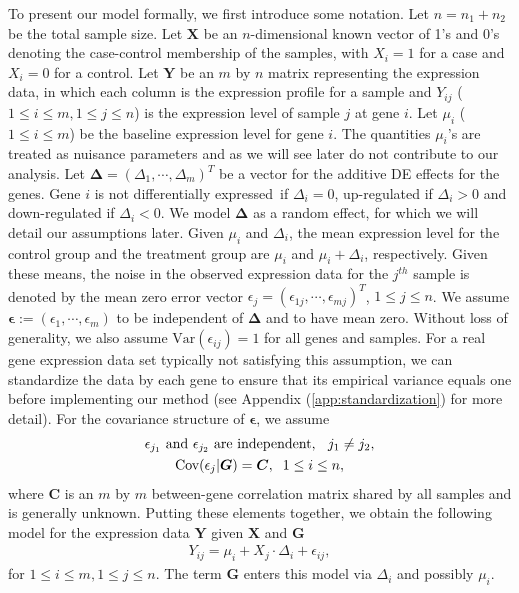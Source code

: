 \documentclass[a4,center,fleqn]{NAR}
\newcommand{\DED}{differentially expressed}
\begin{document}
	To present our model formally, we first introduce some notation. Let $n=n_1+n_2$ be the total
	sample size. Let $\bm X$ be an $n$-dimensional known vector of 1's and 0's denoting the 
	case-control membership of the samples, with $X_i=1$ for a case and $X_i=0$ for a control. Let 
	$\bm Y$ be an $m$ by $n$ matrix representing the expression data, in which each column is the 
	expression profile for a sample and $Y_{ij}$ ($1\le i\le m, 1\le j\le n$) is the expression 
	level of sample $j$ at gene	$i$. Let $\mu_i$ ($1\le i\le m$) be the baseline expression 
	level for gene $i$. The quantities $\mu_i$'s are treated as nuisance parameters and as we will 
	see later do not contribute to our analysis. Let $\bm \Delta=(\Delta_1, \cdots, \Delta_m)^T$ be 
	a vector for the additive DE effects for the genes. Gene $i$ is not \DED~if $\Delta_i=0$, 
	up-regulated if $\Delta_i >0 $ and down-regulated if $\Delta_i<0$. We model $\bm \Delta$ as a 
	random effect, for which we will detail our assumptions later. Given $\mu_i$ and $\Delta_i$, 
	the mean expression level for the control group and the treatment group are $\mu_i$ and 
	$\mu_i+\Delta_i$, respectively. Given these means, the noise in the observed expression data 
	for the $j^{th}$ sample is denoted by the mean zero error vector 
	$\epsilon_j=(\epsilon_{1j},\cdots,\epsilon_{mj})^T$, $1\le j\le n$. We assume
	$\bm\epsilon:=(\epsilon_1,\cdots,\epsilon_m)$ to be independent of $\bm \Delta$ and to have mean
	zero. Without loss of generality, we also assume $\mbox{Var}(\epsilon_{ij})=1$ for all genes and
	samples. For a real gene expression data set typically not satisfying this assumption, we can
	standardize the data by each gene to ensure that its empirical variance equals one before 
	implementing our method (see Appendix (\ref{app:standardization}) for more detail). For the 
	covariance structure of $\bm \epsilon$, we assume 
	\begin{gather}
	\text{$\epsilon_{j_1}$ and $\epsilon_{j_2}$ are independent, \;\;$j_1\ne
		j_2$},\label{eq:gene_indep}\\
	\mbox{Cov}(\epsilon_j|\bm G)=\bm C, \;\;1\le i\le n,\label{eq:gene_cor}
	\end{gather}
	where $\bm C$ is an $m$ by $m$ between-gene correlation matrix shared by all samples and is
	generally unknown. Putting these elements together, we obtain the following model for the 
	expression data $\bm Y$ given $\bm X$ and $\bm G$ 
	\begin{align}
	\label{eq:Ymodel}
	Y_{ij} = \mu_i + X_j\cdot\Delta_i + \epsilon_{ij},
	\end{align}
	for $1\le i\le m, 1\le j\le n$. The term $\bm G$ enters this model via $\Delta_i$ and possibly 
	$\mu_i$.
	
\end{document}
